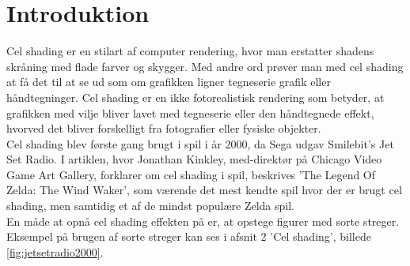\newpage
\section{Introduktion}
\setcounter{page}{1}
Cel shading er en stilart af computer rendering, hvor man erstatter shadens skråning med flade farver og skygger. Med andre ord prøver man med cel shading at få det til at se ud som om grafikken ligner tegneserie grafik eller håndtegninger. Cel shading er en ikke fotorealistisk rendering som betyder, at grafikken med vilje bliver lavet med tegneserie eller den håndtegnede effekt, hvorved det bliver forskelligt fra fotografier eller fysiske objekter. \\
Cel shading blev første gang brugt i spil i år 2000, da Sega udgav  Smilebit's Jet Set Radio\cite{tvtropes}. I artiklen\cite{kinkley2016}, hvor Jonathan Kinkley, med-direktør på Chicago Video Game Art Gallery, forklarer om cel shading i spil, beskrives ’The Legend Of Zelda: The Wind Waker', som værende det mest kendte spil hvor der er brugt cel shading, men samtidig et af de mindst populære Zelda spil.
\\
En måde at opnå cel shading effekten på er, at opstege figurer med sorte streger. Eksempel på brugen af sorte streger kan ses i afsnit 2 'Cel shading', billede \ref{fig:jetsetradio2000}.